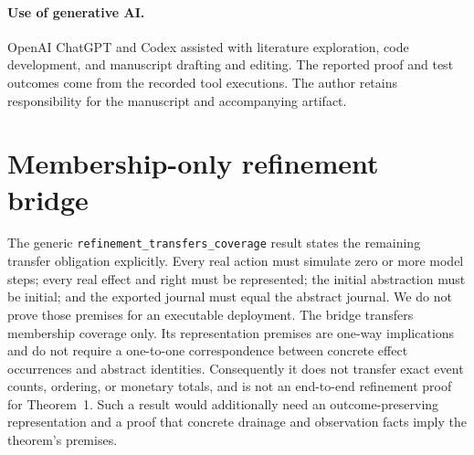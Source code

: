 \documentclass[letterpaper]{article}
\newcommand{\code}[1]{\texttt{#1}}
\begin{document}
\paragraph{Use of generative AI.}
OpenAI ChatGPT and Codex assisted with literature exploration, code development,
and manuscript drafting and editing. The reported proof and test outcomes
come from the recorded tool executions. The author retains responsibility
for the manuscript and accompanying artifact.

\section{Membership-only refinement bridge}
\label{app:bridge}
The generic \code{refinement\_transfers\_coverage} result states the remaining
transfer obligation explicitly. Every real action must simulate zero or more
model steps; every real effect and right must be represented; the initial
abstraction must be initial; and the exported journal must equal the abstract
journal. We do not prove those premises for an executable deployment.
The bridge transfers membership coverage only. Its representation premises
are one-way implications and do not require a one-to-one correspondence
between concrete effect occurrences and abstract identities. Consequently it
does not transfer exact event counts, ordering, or monetary totals, and is not
an end-to-end refinement proof for Theorem~1. Such a result would additionally
need an outcome-preserving representation and a proof that concrete drainage
and observation facts imply the theorem's premises.



\end{document}
